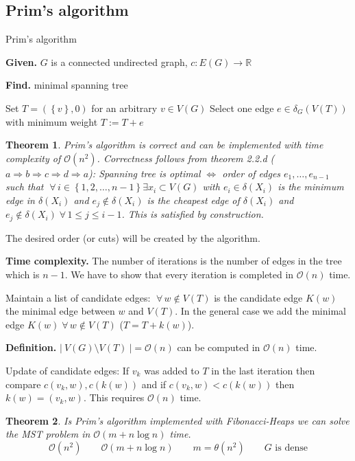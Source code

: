 \documentclass{article}
\newtheorem{theorem}{Theorem}
\newcommand{\card}[1]{\left|\:\!#1\:\!\right|}
\newcommand{\set}[1]{\left\{#1\right\}}
\newcommand{\given}[1]{\textbf{Given.} #1\par}
\newcommand{\find}[1]{\textbf{Find.} #1\par}
\newcommand{\fall}{\;\forall\,}
\begin{document}
\subsection{Prim's algorithm}
%
\begin{algorithm}
  \caption{Prim's algorithm}
  \label{prims-algo}
  \given{$G$ is a connected undirected graph, $c: E(G) \rightarrow \mathbb{R}$}
  \find{minimal spanning tree}
\begin{algorithmic}[1]
  \State Set $T = (\set{v}, 0)$ for an arbitrary $v \in V(G)$
    \State Select one edge $e \in \delta_G(V(T))$ with minimum weight
    \State $T := T + e$
  \EndWhile
\end{algorithmic}
\end{algorithm}

\begin{theorem}\label{satz-2.6}
  Prim's algorithm is correct and can be implemented with time complexity of $\mathcal{O}(n^2)$.
  Correctness follows from theorem 2.2.d ($a \Rightarrow b \Rightarrow c \Rightarrow d \Rightarrow a$):
    Spanning tree is optimal $\Leftrightarrow$ order of edges $e_1, \ldots, e_{n-1}$ such that
    $\fall i \in \set{1, 2, \ldots, n-1} \exists x_i \subset V(G)$ with $e_i \in \delta(X_i)$
    is the minimum edge in $\delta(X_i)$ and $e_j \notin \delta(X_i)$ is the cheapest edge of $\delta(X_i)$
    and $e_j \notin \delta(X_i) \fall 1 \leq j \leq i-1$. This is satisfied by construction.
\end{theorem}

The desired order (or cuts) will be created by the algorithm.

\textbf{Time complexity.} The number of iterations is the number of edges in the tree which is $n-1$.
We have to show that every iteration is completed in $\mathcal{O}(n)$ time.

Maintain a list of candidate edges: $\fall w \notin V(T)$ is the candidate edge $K(w)$ the minimal edge between $w$ and $V(T)$.
In the general case we add the minimal edge $K(w) \fall w \notin V(T)$ ($T = T + k(w)$).

\textbf{Definition.}
  $\card{V(G) \setminus V(T)} = \mathcal{O}(n)$ can be computed in $\mathcal{O}(n)$ time.

Update of candidate edges: If $v_k$ was added to $T$ in the last iteration then compare $c(v_k, w), c(k(w))$ and if $c(v_k, w) < c(k(w))$ then $k(w) = (v_k, w)$. This requires $\mathcal{O}(n)$ time.

\begin{theorem}\label{satz-2.7}
  Is Prim's algorithm implemented with Fibonacci-Heaps we can solve the MST problem in $\mathcal{O}(m + n\log{n})$ time.
  \[
    \mathcal{O}(n^2) \qquad \mathcal{O}(m + n\log{n}) \qquad m = \theta(n^2) \qquad G \text{ is dense}
  \]
\end{theorem}
\end{document}

